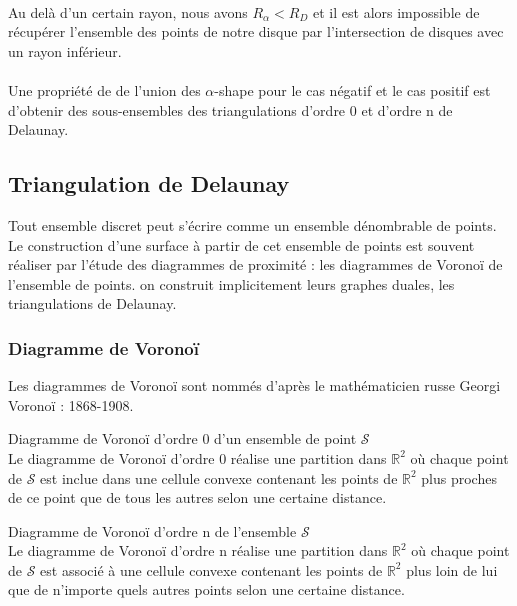 \paragraph{}
Au delà d'un certain rayon, nous avons $R_{\alpha} < R_D$ et il est alors impossible de récupérer l'ensemble des points de notre disque par l'intersection de disques avec un rayon inférieur.

\paragraph{}
Une propriété \cite{EdeKirSei83} de de l'union des $\alpha$-shape pour le cas négatif et le cas positif est d'obtenir des sous-ensembles des triangulations d'ordre 0 et d'ordre n de Delaunay.  

\subsection{Triangulation de Delaunay}

Tout ensemble discret peut s'écrire comme un ensemble dénombrable de points. Le construction d'une surface à partir de cet ensemble de points est souvent réaliser par l'étude des diagrammes de proximité : les diagrammes de Voronoï de l'ensemble de points. on construit implicitement leurs graphes duales, les triangulations de Delaunay.


\subsubsection{Diagramme de Voronoï}

Les diagrammes de Voronoï sont nommés d'après le mathématicien russe Georgi Voronoï : 1868-1908.

\begin{Definition}{Diagramme de Voronoï d'ordre 0 d'un ensemble de point $\mathcal{S}$}\\
\label{def:tri-vor-0}
  Le diagramme de Voronoï d'ordre 0 réalise une partition dans $\mathbb{R}^2$ où chaque point de $\mathcal{S}$ est inclue dans une cellule convexe contenant les points de $\mathbb{R}^2$ plus proches de ce point que de tous les autres selon une certaine distance.
\end{Definition}

 \begin{Definition}{Diagramme de Voronoï d'ordre n de l'ensemble $\mathcal{S}$}\\
\label{def:tri-vor-n}
   Le diagramme de Voronoï d'ordre n réalise une partition dans $\mathbb{R}^2$ où chaque point de $\mathcal{S}$ est associé à une cellule convexe contenant les points de $\mathbb{R}^2$ plus loin de lui que de n'importe quels autres points selon une certaine distance.
\end{Definition}

